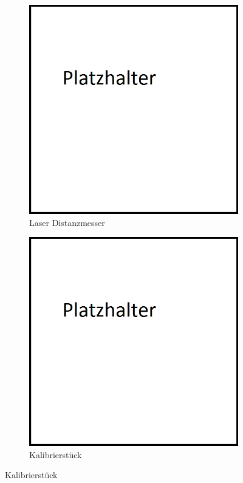 \begin{figure}[ht!]
         \centering
         \caption[Kalibrierwerkzeuge]{Werkzeuge die bei der Kalibrierung verwendet werden.}
         \begin{subfigure}[h]{0.4\textwidth}
                 \centering
                 \includegraphics[width=\textwidth]{img/00_placeholder-sqare.png}
                 \caption{Laser Distanzmesser}
                 \label{fig:laser_meter}
         \end{subfigure}
%
\qquad         
%
         \begin{subfigure}[h]{0.4\textwidth}
                 \centering
                 \includegraphics[width=\textwidth]{img/00_placeholder-sqare.png}
                 \caption{Kalibrierstück}
                 \label{fig:calib_piece}
         \end{subfigure}
         \label{fig:Calibration_Tools}
\end{figure}
 
